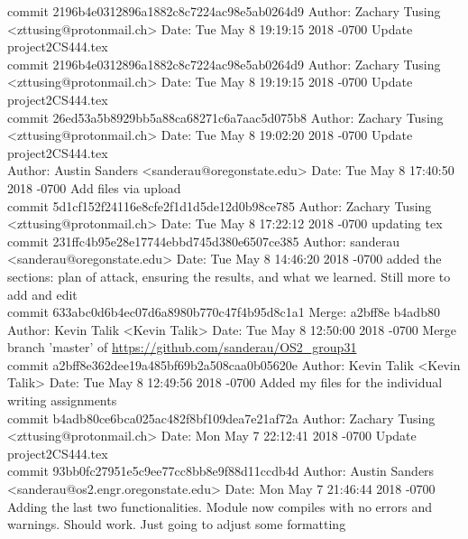 \documentclass[onecolumn, draftclsnofoot,10pt, compsoc]{IEEEtran}
\begin{document}
        {\obeylines %
        commit 2196b4e0312896a1882c8c7224ac98e5ab0264d9
Author: Zachary Tusing <zttusing@protonmail.ch>
Date:   Tue May 8 19:19:15 2018 -0700
Update project2CS444.tex\\

commit 2196b4e0312896a1882c8c7224ac98e5ab0264d9
Author: Zachary Tusing <zttusing@protonmail.ch>
Date:   Tue May 8 19:19:15 2018 -0700
Update project2CS444.tex\\

commit 26ed53a5b8929bb5a88ca68271c6a7aac5d075b8
Author: Zachary Tusing <zttusing@protonmail.ch>
Date:   Tue May 8 19:02:20 2018 -0700
Update project2CS444.tex\\

Author: Austin Sanders <sanderau@oregonstate.edu>
Date:   Tue May 8 17:40:50 2018 -0700
Add files via upload\\

commit 5d1cf152f24116e8cfe2f1d1d5de12d0b98ce785
Author: Zachary Tusing <zttusing@protonmail.ch>
Date:   Tue May 8 17:22:12 2018 -0700
updating tex\\

commit 231ffc4b95e28e17744ebbd745d380e6507ce385
Author: sanderau <sanderau@oregonstate.edu>
Date:   Tue May 8 14:46:20 2018 -0700
added the sections: plan of attack, ensuring the results, and what we learned. Still more to add and edit\\

commit 633abc0d6b4ec07d6a8980b770c47f4b95d8c1a1
Merge: a2bff8e b4adb80
Author: Kevin Talik <Kevin Talik>
Date:   Tue May 8 12:50:00 2018 -0700
Merge branch 'master' of \url{https://github.com/sanderau/OS2_group31}\\

commit a2bff8e362dee19a485bf69b2a508caa0b05620e
Author: Kevin Talik <Kevin Talik>
Date:   Tue May 8 12:49:56 2018 -0700
Added my files for the individual writing assignments\\

commit b4adb80ce6bca025ac482f8bf109dea7e21af72a
Author: Zachary Tusing <zttusing@protonmail.ch>
Date:   Mon May 7 22:12:41 2018 -0700
Update project2CS444.tex\\

commit 93bb0fc27951e5c9ee77cc8bb8e9f88d11ccdb4d
Author: Austin Sanders <sanderau@os2.engr.oregonstate.edu>
Date:   Mon May 7 21:46:44 2018 -0700
Adding the last two functionalities. Module now compiles with no errors and warnings. Should work. Just going to adjust some formatting\\

}
\end{document}

